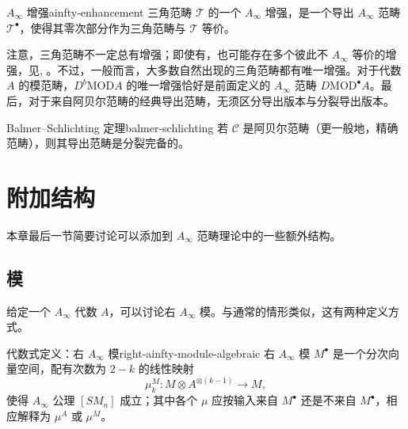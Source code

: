 \begin{definition}{$A_\infty$ 增强}{ainfty-enhancement}
三角范畴 $\mathcal T$ 的一个 $A_\infty$ 增强，是一个导出 $A_\infty$ 范畴 $\mathcal T^\bullet$，使得其零次部分作为三角范畴与 $\mathcal T$ 等价。
\end{definition}

\begin{note}\label{note:enhancements}
注意，三角范畴不一定总有增强；即使有，也可能存在多个彼此不 $A_\infty$ 等价的增强，见, 。不过，一般而言，大多数自然出现的三角范畴都有唯一增强。对于代数 $A$ 的模范畴，$D^b\mathrm{MOD}A$ 的唯一增强恰好是前面定义的 $A_\infty$ 范畴 $D\mathrm{MOD}^\bullet A$。最后，对于来自阿贝尔范畴的经典导出范畴，无须区分导出版本与分裂导出版本。
\end{note}

\begin{theorem}{Balmer–Schlichting 定理}{balmer-schlichting}
若 $\mathcal C$ 是阿贝尔范畴（更一般地，精确范畴），则其导出范畴是分裂完备的。
\end{theorem}

\section{附加结构}\label{sec:ainfty-extras}
本章最后一节简要讨论可以添加到 $A_\infty$ 范畴理论中的一些额外结构。


\subsection{模}\label{subsec:ainfty-modules}
给定一个 $A_\infty$ 代数 $A$，可以讨论右 $A_\infty$ 模。与通常的情形类似，这有两种定义方式。

\begin{definition}{代数式定义：右 $A_\infty$ 模}{right-ainfty-module-algebraic}
右 $A_\infty$ 模 $M^\bullet$ 是一个分次向量空间，配有次数为 $2-k$ 的线性映射
\[
  \mu_k^M\colon M\otimes A^{\otimes(k-1)}\longrightarrow M,
\]
使得 $A_\infty$ 公理 $[SM_n]$ 成立；其中各个 $\mu$ 应按输入来自 $M^\bullet$ 还是不来自 $M^\bullet$，相应解释为 $\mu^A$ 或 $\mu^M$。
\end{definition}

